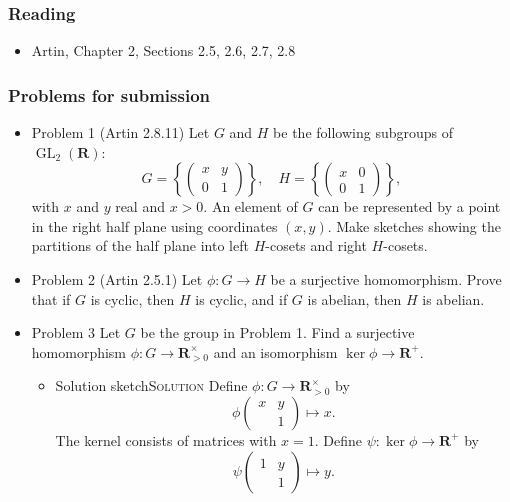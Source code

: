 \documentclass[11pt]{article}
\begin{document}
\subsubsection*{Reading}
\label{sec:org456e913}
\begin{itemize}
\item Artin, Chapter 2, Sections 2.5, 2.6, 2.7, 2.8
\end{itemize}
\subsubsection*{Problems for submission}
\label{sec:orgebcf1e3}
\begin{itemize}
\item Problem 1
\label{sec:orgeef570c}
(Artin 2.8.11)
   Let \(G\)  and \(H\) be the following subgroups of \(\operatorname{GL}_2(\mathbf{R})\):
   \[
   G = \left\{ \begin{pmatrix} x & y \\ 0 & 1 \end{pmatrix}\right\}, \quad H = \left\{ \begin{pmatrix} x & 0 \\ 0 & 1 \end{pmatrix}\right\},
   \]
   with \(x\) and \(y\) real and \(x > 0\).
   An element of \(G\) can be represented by a point in the right half plane using coordinates \((x,y)\).
   Make sketches showing the partitions of the half plane into left \(H\)-cosets and right \(H\)-cosets.


\item Problem 2
\label{sec:org7cc6f55}
(Artin 2.5.1)
   Let \(\phi \colon G \to H\) be a surjective homomorphism. 
   Prove that if \(G\) is cyclic, then \(H\) is cyclic, and if \(G\) is abelian, then \(H\) is abelian.

\item Problem 3
\label{sec:orgc8ce0b1}
Let \(G\) be the group in Problem 1.
Find a surjective homomorphism \(\phi \colon G \to \mathbf{R}_{> 0}^{\times}\) and an isomorphism \(\ker \phi \to \mathbf{R}^+\).

\begin{itemize}
\item Solution sketch\hfill{}\textsc{Solution}
\label{sec:org3a9f67a}
Define \(\phi \colon G \to \mathbf{R}_{> 0}^{\times}\) by
\[ \phi \begin{pmatrix} x & y \\ & 1 \end{pmatrix} \mapsto x.\]
The kernel consists of matrices with \(x = 1\).
Define \(\psi \colon \ker \phi \to \mathbf{R}^+\) by
\[ \psi \begin{pmatrix} 1 & y \\ & 1 \end{pmatrix} \mapsto y.\]


\end{itemize}
\end{itemize}
\end{document}
